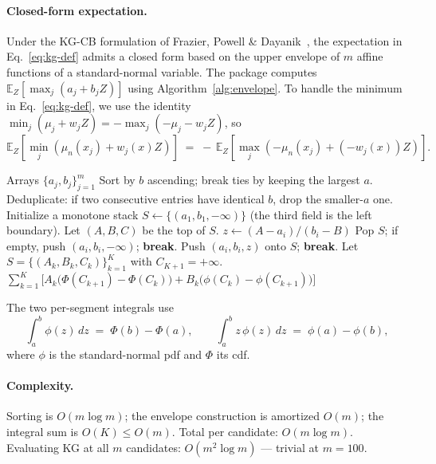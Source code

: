 \documentclass[11pt]{article}
\newcommand{\Ex}{\mathbb{E}}
\newcommand{\muN}{\mu_n}
\begin{document}
\paragraph{Closed-form expectation.} Under the KG-CB formulation of Frazier,
Powell \& Dayanik~\cite{frazier2009}, the expectation in Eq.~\eqref{eq:kg-def}
admits a closed form based on the upper envelope of $m$ affine functions of
a standard-normal variable. The package computes
$\Ex_Z[\max_j (a_j + b_j Z)]$ using
Algorithm~\ref{alg:envelope}. To handle the minimum in Eq.~\eqref{eq:kg-def},
we use the identity $\min_j(\mu_j + w_j Z) = -\max_j(-\mu_j - w_j Z)$, so
\[
  \Ex_Z\!\left[\min_j (\muN(x_j) + w_j(x) Z)\right] \;=\; -\,\Ex_Z\!\left[\max_j (-\muN(x_j) + (-w_j(x)) Z)\right].
\]

\begin{algorithm}[t]
  \caption{Closed-form $\Ex_Z[\max_j (a_j + b_j Z)]$ via Frazier--Powell--Dayanik (2009).}
  \label{alg:envelope}
  \begin{algorithmic}[1]
    \Require Arrays $\{a_j, b_j\}_{j=1}^m$
    \State Sort by $b$ ascending; break ties by keeping the largest $a$.
    \State Deduplicate: if two consecutive entries have identical $b$, drop the smaller-$a$ one.
    \State Initialize a monotone stack $S \gets \{(a_1, b_1, -\infty)\}$ (the third field is the left boundary).
      \Loop
        \State Let $(A, B, C)$ be the top of $S$.
        \State $z \gets (A - a_i) / (b_i - B)$
         
          \State Pop $S$; if empty, push $(a_i, b_i, -\infty)$; \textbf{break}.
        \Else
          \State Push $(a_i, b_i, z)$ onto $S$; \textbf{break}.
        \EndIf
      \EndLoop
    \EndFor
    \State Let $S = \{(A_k, B_k, C_k)\}_{k=1}^K$ with $C_{K+1} = +\infty$.
    \State \Return $\displaystyle\sum_{k=1}^K \bigl[A_k \bigl(\Phi(C_{k+1}) - \Phi(C_k)\bigr) + B_k \bigl(\phi(C_k) - \phi(C_{k+1})\bigr)\bigr]$
  \end{algorithmic}
\end{algorithm}

The two per-segment integrals use
\[
  \int_a^b \phi(z)\,dz \;=\; \Phi(b) - \Phi(a),
  \qquad
  \int_a^b z\,\phi(z)\,dz \;=\; \phi(a) - \phi(b),
\]
where $\phi$ is the standard-normal pdf and $\Phi$ its cdf.

\paragraph{Complexity.} Sorting is $O(m \log m)$; the envelope construction
is amortized $O(m)$; the integral sum is $O(K) \leq O(m)$. Total per
candidate: $O(m \log m)$. Evaluating KG at all $m$ candidates: $O(m^2 \log
m)$ — trivial at $m = 100$.
\end{document}
